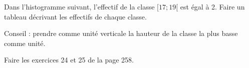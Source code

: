 
\begin{exercice}\label{exoSeconde-0035}

Dans l'histogramme suivant, l'effectif de la classe $[17;19[$ est égal à 2. Faire un tableau décrivant les effectifs de chaque classe. 
\begin{center}
   
\end{center}
Conseil : prendre comme unité verticale la hauteur de la classe la plus basse comme unité.

Faire les exercices 24 et 25 de la page 258.

\end{exercice}
